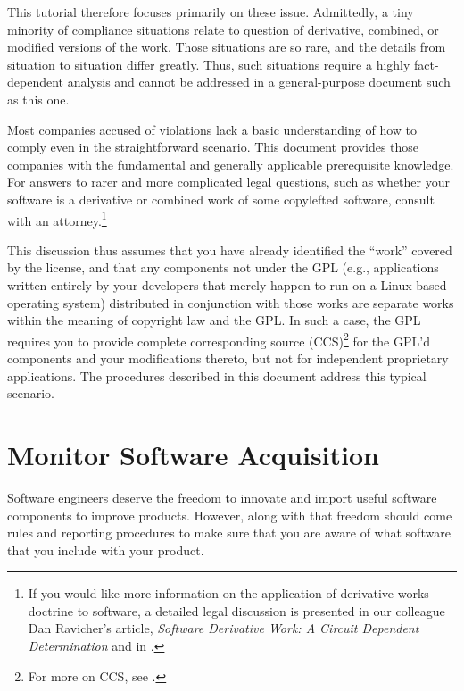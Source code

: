 This tutorial therefore focuses primarily on these issue.
Admittedly, a tiny
minority of compliance situations relate to question of derivative,
combined, or modified versions of the work.  Those
situations are so rare, and the details from situation to situation differ
greatly.  Thus, such situations require a highly
fact-dependent analysis and cannot be addressed in a general-purpose
document such as this one.

\medskip

Most companies accused of violations lack a basic understanding
of how to comply even in the straightforward scenario.  This document
provides those companies with the fundamental and generally applicable prerequisite knowledge.
For answers to rarer and more complicated legal questions, such as whether
your software is a derivative or combined work of some copylefted software, consult
with an attorney.\footnote{If you would like more information on the
  application of derivative works doctrine to software, a detailed legal
  discussion is presented in our colleague Dan Ravicher's article,
  \textit{Software Derivative Work: A Circuit Dependent Determination} and in
  .}

This discussion thus assumes that you have already identified the
``work'' covered by the license, and that any components not under the GPL
(e.g., applications written entirely by your developers that merely happen
to run on a Linux-based operating system) distributed in conjunction with
those works are separate works within the meaning of copyright law and the GPL\@.  In
such a case, the GPL requires you to provide complete corresponding
source (CCS)\footnote{For more on CCS,  see
.}
for the GPL'd components and your modifications thereto, but not
for independent proprietary applications.  The procedures described in
this document address this typical scenario.


\section{Monitor Software Acquisition}

Software engineers deserve the freedom to innovate and import useful
software components to improve products.  However, along with that
freedom should come rules and reporting procedures to make sure that you
are aware of what software that you include with your product.

